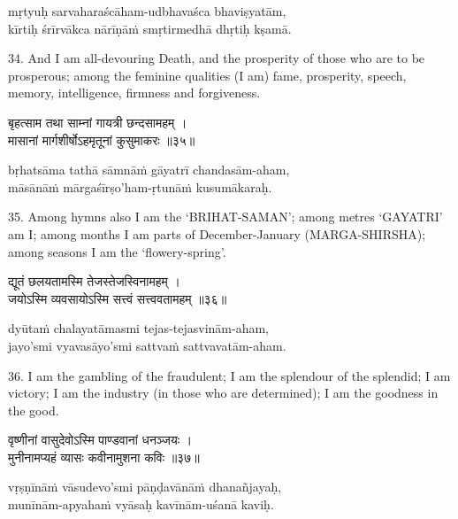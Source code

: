 \begin{transliteration}
mṛtyuḥ sarvaharaścāham-udbhavaśca bhaviṣyatām, \\
kīrtiḥ śrīrvākca nārīṇāṁ smṛtirmedhā dhṛtiḥ kṣamā.
\end{transliteration}

34. And I am all-devouring Death, and the prosperity of those who are to be
prosperous; among the feminine qualities (I am) fame, prosperity, speech,
memory, intelligence, firmness and forgiveness.

\begin{gitaverse}
बृहत्साम तथा साम्नां गायत्री छन्दसामहम् । \\
मासानां मार्गशीर्षोऽहमृतूनां कुसुमाकरः ॥३५॥
\end{gitaverse}

\begin{transliteration}
bṛhatsāma tathā sāmnāṁ gāyatrī chandasām-aham, \\
māsānāṁ mārgaśīrṣo'ham-ṛtunāṁ kusumākaraḥ.
\end{transliteration}

35. Among hymns also I am the `BRIHAT-SAMAN'; among metres `GAYATRI' am I;\@
among months I am parts of December-January (MARGA-SHIRSHA); among seasons I am
the `flowery-spring'.

\begin{gitaverse}
द्यूतं छलयतामस्मि तेजस्तेजस्विनामहम् । \\
जयोऽस्मि व्यवसायोऽस्मि सत्त्वं सत्त्ववतामहम् ॥३६॥
\end{gitaverse}

\begin{transliteration}
dyūtaṁ chalayatāmasmi tejas-tejasvinām-aham, \\
jayo'smi vyavasāyo'smi sattvaṁ sattvavatām-aham.
\end{transliteration}

36. I am the gambling of the fraudulent; I am the splendour of the splendid; I
am victory; I am the industry (in those who are determined); I am the goodness
in the good.

\begin{gitaverse}
वृष्णीनां वासुदेवोऽस्मि पाण्डवानां धनञ्जयः । \\
मुनीनामप्यहं व्यासः कवीनामुशना कविः ॥३७॥
\end{gitaverse}

\begin{transliteration}
vṛṣṇīnāṁ vāsudevo'smi pāṇḍavānāṁ dhanañjayaḥ, \\
munīnām-apyahaṁ vyāsaḥ kavīnām-uśanā kaviḥ.
\end{transliteration}

